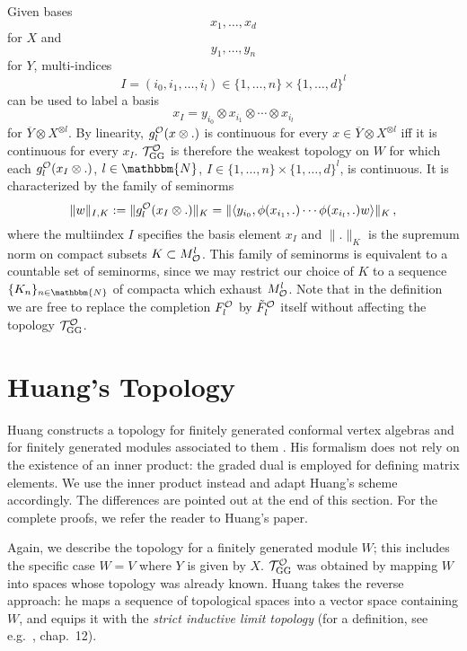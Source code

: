 \documentclass[a4paper,12pt,twoside]{article}
\renewcommand{\b}{\langle}
\renewcommand{\k}{\rangle}
\renewcommand{\c}[1]{{\cal #1}}
\newcommand{\bN}{\mathbbm{N}}
\newcommand{\cT}{{\cal T}}
\renewcommand{\O}{\c{O}}
\newcommand{\GG}{{\rm GG}}
\newcommand{\TGG}{\cT_{\GG}^{\O}}
\newcommand{\Fo}{F^{\O}_l}
\newcommand{\hF}{\tilde{F}}
\newcommand{\hFo}{\hF^{\O}_l}
\newcommand{\Mo}{M^l_{\O}}
\newcommand{\go}{g_l^{\O}}
\newcommand{\Yb}{\overline{Y}}
\begin{document}
Given bases
\begin{equation}
\label{basis}
x_1,\ldots,x_d
\end{equation}
for $X$ and
\begin{equation}
\label{basisY}
y_1,\ldots,y_n
\end{equation}
for $Y$,
multi-indices
$$I = (i_0,i_1,\ldots,i_l)\in \{1,\ldots,n\}\times\{1,\ldots,d\}^l$$
can be used to label a basis
$$x_I = y_{i_0}\otimes x_{i_1}\otimes\cdots\otimes x_{i_l}$$
for $\Yb\otimes X^{\otimes l}$.
By linearity, $\go(x\otimes .)$ is continuous for every
$x\in \Yb\otimes X^{\otimes l}$ iff it is continuous for every
$x_I$.
$\TGG$ is therefore the weakest
topology on $W$ for which each $\go(x_I\otimes .)$, $l\in\bN$,
$I\in\{1,\ldots,n\}\times\{1,\ldots,d\}^l$, is continuous.
It is characterized by the family of seminorms
\begin{equation}
\label{semiGod}
\|w\|_{I,K} := \|\go(x_I\otimes .)\|_K = \|\b y_{i_0},\phi(x_{i_1},.)\cdots
\phi(x_{i_l},.)w\k\|_K\,,
\end{equation}
where the multiindex $I$ specifies the basis element $x_I$ and
$\|.\|_K$ is
the supremum norm on compact subsets $K\subset\Mo$.
This family of seminorms is equivalent to a countable set of seminorms,
since we may restrict our choice of $K$ to a sequence $\{K_n\}_{n\in\bN}$ of compacta
which exhaust $\Mo$.
Note that in the definition we are free to replace
the completion $\Fo$ by $\hFo$ itself without
affecting the topology $\TGG$.


\section{Huang's Topology}
\label{Huangs_Topology}
Huang constructs a topology for finitely generated conformal
vertex algebras and for finitely generated modules associated to them \cite{Huang}.
His formalism
does not rely on the existence of an inner product:
the graded dual is employed for defining matrix elements.
We use the inner product instead and adapt
Huang's scheme
accordingly. The differences are pointed out at the end
of this section. For the complete proofs, we refer the reader
to Huang's paper.

Again, we describe the topology for a finitely generated
module $W$; this includes the specific case $W = V$
where $Y$ is given by $X$.
$\TGG$ was obtained by mapping $W$ into spaces whose topology was already known.
Huang takes the reverse approach: he maps a sequence of
topological spaces into a
vector space containing $W$, and equips it with
the {\it strict inductive limit topology} (for a definition, see e.g.\ \cite{Narici}, chap.\ 12).
\end{document}
